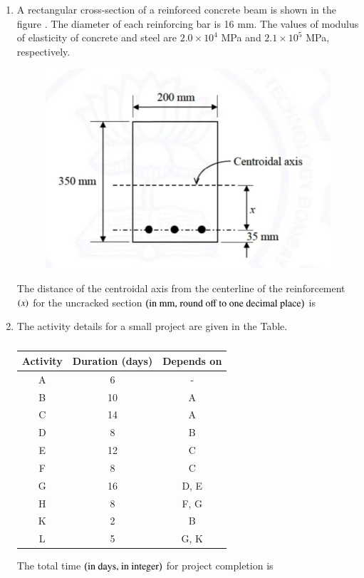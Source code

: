 \documentclass[journal,12pt,onecolumn]{article}
\theoremstyle{remark}
\begin{document}
\begin{enumerate}
\item A rectangular cross-section of a reinforced concrete beam is shown in the figure . The diameter of each reinforcing bar is 16 mm. The values of modulus of elasticity of concrete and steel are $2.0 \times 10^4$ MPa and $2.1 \times 10^5$ MPa, respectively.
\begin{figure}[H]
    \centering
    \includegraphics[width=0.7\columnwidth]{figs/2q41.jpg}
    \caption{}
    \label{fig:q41}
\end{figure}
The distance of the centroidal axis from the centerline of the reinforcement $\left(x\right)$ for the uncracked section $\left(\text{in mm, round off to one decimal place}\right)$ is \underline{\hspace{2cm}}

\hfill{}

\item The activity details for a small project are given in the Table.
\begin{table}[H]
    \centering
    \begin{tabular}{|c|c|c|}
        \hline
        \textbf{Activity} & \textbf{Duration (days)} & \textbf{Depends on} \\ \hline
        A & 6 & - \\ \hline
        B & 10 & A \\ \hline
        C & 14 & A \\ \hline
        D & 8 & B \\ \hline
        E & 12 & C \\ \hline
        F & 8 & C \\ \hline
        G & 16 & D, E \\ \hline
        H & 8 & F, G \\ \hline
        K & 2 & B \\ \hline
        L & 5 & G, K \\ \hline
    \end{tabular}
    \caption{}
    \label{tab:q42}
\end{table}
The total time $\left(\text{in days, in integer}\right)$ for project completion is \underline{\hspace{2cm}}


\end{enumerate}
\end{document}
